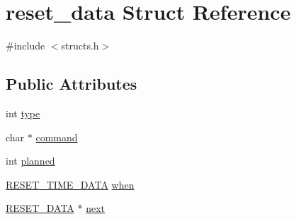 \hypertarget{structreset__data}{\section{reset\-\_\-data Struct Reference}
\label{structreset__data}
}


{\ttfamily \#include $<$structs.\-h$>$}

\subsection*{Public Attributes}
\begin{DoxyCompactItemize}
\item 
int \hyperlink{structreset__data_af518385675ad348fe04d9408d896ab4b}{type}
\item 
char $\ast$ \hyperlink{structreset__data_a154e87496be589f7368bd44df6ff35b8}{command}
\item 
int \hyperlink{structreset__data_a048db6f0dd944e163a034a683cefc9eb}{planned}
\item 
\hyperlink{structs_8h_ab8c9827ae2b81aea970323019a271457}{R\-E\-S\-E\-T\-\_\-\-T\-I\-M\-E\-\_\-\-D\-A\-T\-A} \hyperlink{structreset__data_a0eb10a34752f22bfe0d2dab4686771ba}{when}
\item 
\hyperlink{structs_8h_ab78d529b5a10f3e757885b70f902d46a}{R\-E\-S\-E\-T\-\_\-\-D\-A\-T\-A} $\ast$ \hyperlink{structreset__data_a970a80e250723327432365f14d118603}{next}
\end{DoxyCompactItemize}


